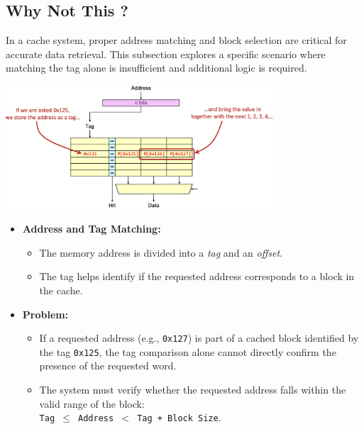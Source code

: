 \subsection{Why Not This ?}
In a cache system, proper address matching and block selection are critical for accurate data retrieval. This subsection explores a specific scenario where matching the tag alone is insufficient and additional logic is required.
\begin{center}
    \includegraphics[width=0.75\textwidth]{chapters/chapter3a/images/notthis.png}
\end{center}
\begin{itemize}
    \item \textbf{Address and Tag Matching:} 
    \begin{itemize}
        \item The memory address is divided into a \textit{tag} and an \textit{offset}.
        \item The tag helps identify if the requested address corresponds to a block in the cache.
    \end{itemize}
    \item \textbf{Problem:} 
    \begin{itemize}
        \item If a requested address (e.g., \texttt{0x127}) is part of a cached block identified by the tag \texttt{0x125}, the tag comparison alone cannot directly confirm the presence of the requested word.
        \item The system must verify whether the requested address falls within the valid range of the block:\\
         \texttt{Tag $\leq$ Address $<$ Tag + Block Size}.
    \end{itemize}
\end{itemize}
\newpage
